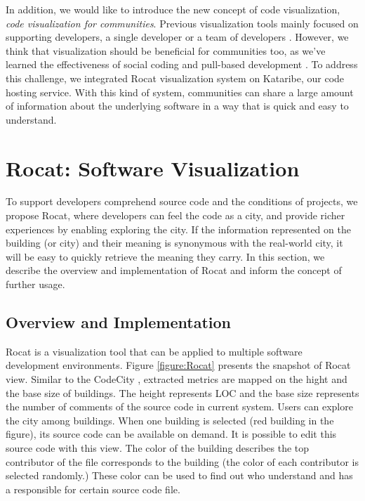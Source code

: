 \documentclass[conference]{IEEEtran}
\newcommand{\figref}[1]{Figure \ref{#1}}
\begin{document}
In addition, we would like to introduce the new concept of code visualization, \textit{code visualization for communities}.
Previous visualization tools mainly focused on supporting developers, a single developer \cite{Wettel:2011:SSC:1985793.1985868} or a team of developers \cite{6648194}.
However, we think that visualization should be beneficial for communities too, as we've learned the effectiveness of social coding \cite{Dabbish:2012:SCG:2145204.2145396} and pull-based development \cite{Gousios:2014:ESP:2568225.2568260}.
To address this challenge, we integrated \textsf{Rocat} visualization system on \textsf{Kataribe},  our code hosting service.
With this kind of system, communities can share a large amount of information about the underlying software in a way that is quick and easy to understand.

\section{Rocat: Software Visualization}
To support developers comprehend source code and the conditions of projects, we propose \textsf{Rocat}, where developers can feel the code as a city, and provide richer experiences by enabling exploring the city.
If the information represented on the building (or city) and their meaning is synonymous with the real-world city, it will be easy to quickly retrieve the meaning they carry.
In this section, we describe the overview and implementation of \textsf{Rocat} and inform the concept of further usage.

\subsection{Overview and Implementation}
\textsf{Rocat} is a visualization tool that can be applied to multiple software development environments.
\figref{figure:Rocat} presents the snapshot of \textsf{Rocat} view.
Similar to the \textsf{CodeCity} \cite{Wettel:2011:SSC:1985793.1985868}, extracted metrics are mapped on the hight and the base size of buildings.
The height represents LOC and the base size represents the number of comments of the source code in current system.
Users can explore the city among buildings.
When one building is selected (red building in the figure), its source code can be available on demand.
It is possible to edit this source code with this view.
The color of the building describes the top contributor of the file corresponds to the building (the color of each contributor is selected randomly.)
These color can be used to find out who understand and has a responsible for certain source code file.
\end{document}
